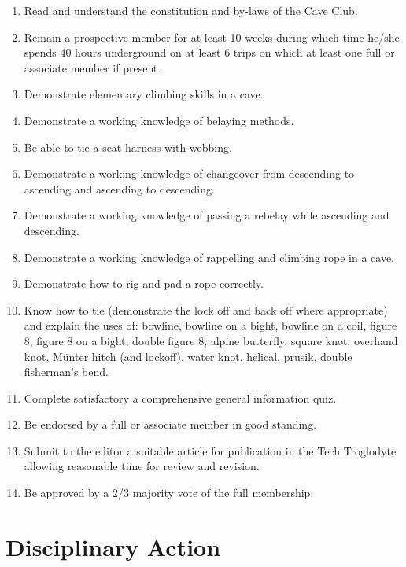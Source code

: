 \documentclass[
]{article}
\providecommand{\tightlist}{%
  \setlength{\itemsep}{0pt}\setlength{\parskip}{0pt}}
\begin{document}
\begin{enumerate}
  \begin{enumerate}
  \def\labelenumii{\Alph{enumii}.}
  \tightlist
  \item
    Read and understand the constitution and by-laws of the Cave Club.
  \item
    Remain a prospective member for at least 10 weeks during which time
    he/she spends 40 hours underground on at least 6 trips on which at
    least one full or associate member if present.
  \item
    Demonstrate elementary climbing skills in a cave.
  \item
    Demonstrate a working knowledge of belaying methods.
  \item
    Be able to tie a seat harness with webbing.
  \item
    Demonstrate a working knowledge of changeover from descending to
    ascending and ascending to descending.
  \item
    Demonstrate a working knowledge of passing a rebelay while ascending
    and descending.
  \item
    Demonstrate a working knowledge of rappelling and climbing rope in a
    cave.
  \item
    Demonstrate how to rig and pad a rope correctly.
  \item
    Know how to tie (demonstrate the lock off and back off where
    appropriate) and explain the uses of: bowline, bowline on a bight,
    bowline on a coil, figure 8, figure 8 on a bight, double figure 8,
    alpine butterfly, square knot, overhand knot, Münter hitch (and
    lockoff), water knot, helical, prusik, double fisherman's bend.
  \item
    Complete satisfactory a comprehensive general information quiz.
  \item
    Be endorsed by a full or associate member in good standing.
  \item
    Submit to the editor a suitable article for publication in the Tech
    Troglodyte allowing reasonable time for review and revision.
  \item
    Be approved by a 2/3 majority vote of the full membership.
  \end{enumerate}
\end{enumerate}

\hypertarget{disciplinary-action}{%
\section{Disciplinary Action}\label{disciplinary-action}}
\end{document}
